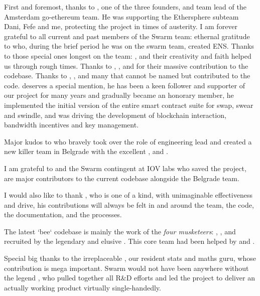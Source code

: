 First and foremost, thanks to , one of the three founders, and team lead of the Amsterdam go-ethereum team. He was supporting the Ethersphere subteam Dani, Fefe and me, protecting the project in times of austerity.
I am forever grateful to all current and past members of the Swarm team: ethernal gratitude to  who, during the brief period he was on the swarm team, created ENS. Thanks to those special ones longest on the team: ,  and  their creativity and faith helped us through rough  times. Thanks to , ,  and  for their massive contribution to the codebase. Thanks to , ,  and many that cannot be named but contributed to the code.
 deserves a special mention, he has been a keen follower and supporter of our project for many years and gradually became an honorary member, he implemented the initial version of the entire smart contract suite for swap, swear and swindle, and was driving the development of blockchain interaction, bandwidth incentives and key management.

Major kudos to  who bravely took over the role of engineering lead and created a new killer team in Belgrade with the excellent ,  and .  

I am grateful to  and the Swarm contingent at IOV labs who saved the project,  are major contributors to the current codebase alongside the  Belgrade team. 

I would also like to thank , who is one of a kind, with unimaginable effectiveness and drive, his contributions will always be felt in and around the team, the code, the documentation, and the processes.

The latest `bee` codebase is mainly the work of the \emph{four musketeers}: , ,  and  recruited by the legendary and elusive . This core team had been helped by  and .



Special big thanks to the irreplaceable , our resident stats and maths guru, whose contribution is mega important. Swarm would not have been anywhere without the legend , who pulled together all R\&D efforts and led the project to deliver an actually working product virtually single-handedly.



